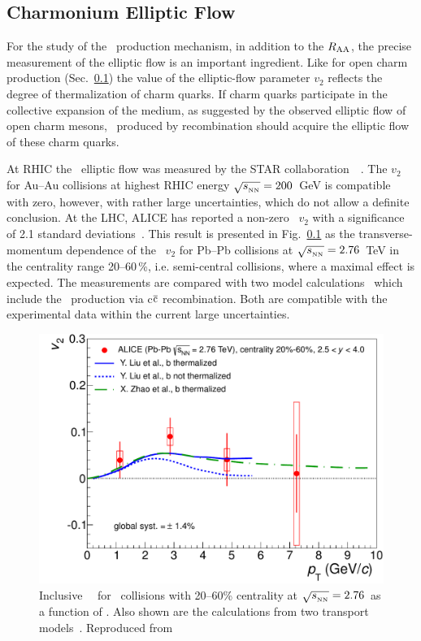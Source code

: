 \subsection{Charmonium Elliptic Flow}

For the study of the \Jpsi\ production mechanism, in addition to the $R_{\rm AA}$, the precise measurement of the elliptic flow is an important ingredient. Like for open charm production (Sec.~\ref{}) the value of the elliptic-flow parameter $v_2$ reflects the degree of thermalization of charm quarks. If charm quarks participate in the collective expansion of the medium, as suggested by the observed elliptic flow of open charm mesons, \jpsi\ produced by recombination should acquire the elliptic flow of these charm quarks.

At RHIC the \Jpsi\ elliptic flow was measured by the STAR collaboration~~\cite{Adamczyk:2012pw}. The $v_2$ for Au--Au collisions at highest RHIC energy $\sqrt{s_{_{\rm NN}}} = 200$~GeV is compatible with zero, however, with rather large uncertainties, which do not allow a definite conclusion. At the LHC, ALICE has reported a non-zero \Jpsi\ $v_2$ with a significance of 2.1 standard deviations~\cite{ALICE:2013xna}. This result is presented in Fig.~\ref{} as the transverse-momentum dependence of the \Jpsi\ $v_2$ for Pb--Pb collisions at $\sqrt{s_{_{\rm NN}}} = 2.76$~TeV in the centrality range 20--60\,\%, i.e. semi-central collisions, where a maximal effect is expected. The measurements are compared with two model calculations~\cite{Liu:2009gx,Zhao:2012gc} which include the \Jpsi\ production via c$\overline{\rm c}$ recombination. Both are compatible with the experimental data within the current large uncertainties.

\begin{figure}
\begin{center}
\includegraphics[width=0.49\linewidth]{quarkoniafigs/prl_fig4-eps-converted-to.pdf}
\caption{\label{fig:GR:v2ptcomp} Inclusive \jpsi\ \vtwo\
for \PbPb\ collisions with 20--60\% centrality at $\sqrt{s_{_{\rm NN}}} = 2.76$\TeV\ as a function of \pT.
Also shown are the calculations from two transport models~\cite{Liu:2009gx,Zhao:2012gc}.
Reproduced from~\cite{ALICE:2013xna}}
\end{center}
\end{figure}

